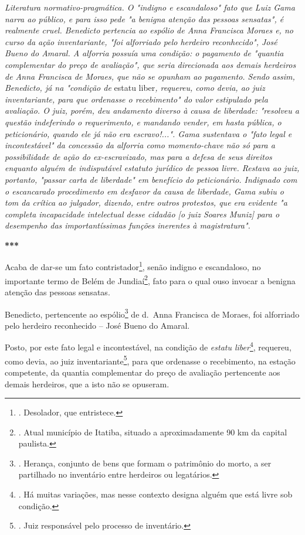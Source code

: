 \emph{Literatura normativo-pragmática. O "indigno e escandaloso" fato
que Luiz Gama narra ao público, e para isso pede "a benigna atenção das
pessoas sensatas", é realmente cruel. Benedicto pertencia ao espólio de
Anna Francisca Moraes e, no curso da ação inventariante, "foi alforriado
pelo herdeiro reconhecido", José Bueno do Amaral. A alforria possuía uma
condição: o pagamento de "quantia complementar do preço de avaliação",
que seria direcionada aos demais herdeiros de Anna Francisca de Moraes,
que não se opunham ao pagamento. Sendo assim, Benedicto, já na "condição
de} estatu liber\emph{, requereu, como devia, ao juiz inventariante,
para que ordenasse o recebimento" do valor estipulado pela avaliação. O
juiz, porém, deu andamento diverso à causa de liberdade: "resolveu a
questão indeferindo o requerimento, e mandando vender, em hasta pública,
o peticionário, quando ele já não era escravo!...". Gama sustentava o
"fato legal e incontestável" da concessão da alforria como momento-chave
não só para a possibilidade de ação do ex-escravizado, mas para a defesa
de seus direitos enquanto alguém de indisputável estatuto jurídico de
pessoa livre. Restava ao juiz, portanto, "passar carta de liberdade" em
benefício do peticionário. Indignado com o escancarado procedimento em
desfavor da causa de liberdade, Gama subiu o tom da crítica ao julgador,
dizendo, entre outros protestos, que era evidente "a completa
incapacidade intelectual desse cidadão {[}o juiz Soares Muniz{]} para o
desempenho das importantíssimas funções inerentes à magistratura".}

\textbf{***}

Acaba de dar-se um fato contristador\footnote{. Desolador, que
  entristece.}, senão indigno e escandaloso, no importante termo de
Belém de Jundiaí\footnote{. Atual município de Itatiba, situado a
  aproximadamente 90 km da capital paulista.}, fato para o qual ouso
invocar a benigna atenção das pessoas sensatas.

Benedicto, pertencente ao espólio\footnote{. Herança, conjunto de bens
  que formam o patrimônio do morto, a ser partilhado no inventário entre
  herdeiros ou legatários.} de d.~Anna Francisca de Moraes, foi
alforriado pelo herdeiro reconhecido -- José Bueno do Amaral.

Posto, por este fato legal e incontestável, na condição de \emph{estatu
liber}\footnote{. Há muitas variações, mas nesse contexto designa alguém
  que está livre sob condição.}, requereu, como devia, ao juiz
inventariante\footnote{. Juiz responsável pelo processo de inventário.},
para que ordenasse o recebimento, na estação competente, da quantia
complementar do preço de avaliação pertencente aos demais herdeiros, que
a isto não se opuseram.

